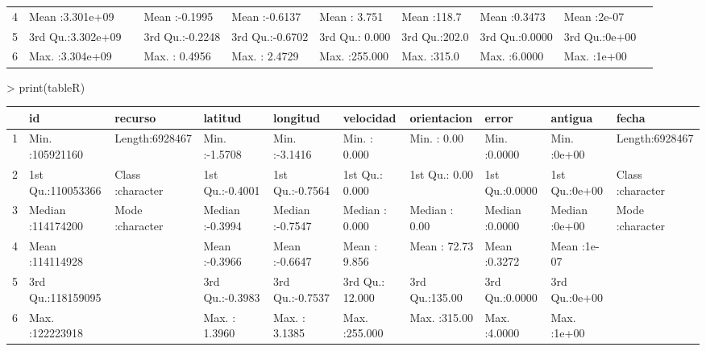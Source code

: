 \documentclass{article}
\begin{document}
\begin{Schunk}
\begin{Soutput}
\begin{table}[ht]
\begin{tabular}{rlllllllll}
  4 & Mean   :3.301e+09   &  & Mean   :-0.1995   & Mean   :-0.6137   & Mean   :  3.751   & Mean   :118.7   & Mean   :0.3473   & Mean   :2e-07   &  \\ 
  5 & 3rd Qu.:3.302e+09   &  & 3rd Qu.:-0.2248   & 3rd Qu.:-0.6702   & 3rd Qu.:  0.000   & 3rd Qu.:202.0   & 3rd Qu.:0.0000   & 3rd Qu.:0e+00   &  \\ 
  6 & Max.   :3.304e+09   &  & Max.   : 0.4956   & Max.   : 2.4729   & Max.   :255.000   & Max.   :315.0   & Max.   :6.0000   & Max.   :1e+00   &  \\ 
   \hline
\end{tabular}
\end{table}
\end{Soutput}
\begin{Sinput}
> print(tableR)
\end{Sinput}
\begin{Soutput}
% latex table generated in R 3.1.2 by xtable 1.7-4 package
% Thu Jul 16 19:05:09 2015
\begin{table}[ht]
\centering
\begin{tabular}{rlllllllll}
  \hline
 &       id &   recurso &    latitud &    longitud &   velocidad &  orientacion &     error &    antigua &    fecha \\ 
  \hline
1 & Min.   :105921160   & Length:6928467     & Min.   :-1.5708   & Min.   :-3.1416   & Min.   :  0.000   & Min.   :  0.00   & Min.   :0.0000   & Min.   :0e+00   & Length:6928467     \\ 
  2 & 1st Qu.:110053366   & Class :character   & 1st Qu.:-0.4001   & 1st Qu.:-0.7564   & 1st Qu.:  0.000   & 1st Qu.:  0.00   & 1st Qu.:0.0000   & 1st Qu.:0e+00   & Class :character   \\ 
  3 & Median :114174200   & Mode  :character   & Median :-0.3994   & Median :-0.7547   & Median :  0.000   & Median :  0.00   & Median :0.0000   & Median :0e+00   & Mode  :character   \\ 
  4 & Mean   :114114928   &  & Mean   :-0.3966   & Mean   :-0.6647   & Mean   :  9.856   & Mean   : 72.73   & Mean   :0.3272   & Mean   :1e-07   &  \\ 
  5 & 3rd Qu.:118159095   &  & 3rd Qu.:-0.3983   & 3rd Qu.:-0.7537   & 3rd Qu.: 12.000   & 3rd Qu.:135.00   & 3rd Qu.:0.0000   & 3rd Qu.:0e+00   &  \\ 
  6 & Max.   :122223918   &  & Max.   : 1.3960   & Max.   : 3.1385   & Max.   :255.000   & Max.   :315.00   & Max.   :4.0000   & Max.   :1e+00   &  \\ 
   \hline
\end{tabular}
\end{table}
\end{Soutput}
\end{Schunk}
\end{document}

